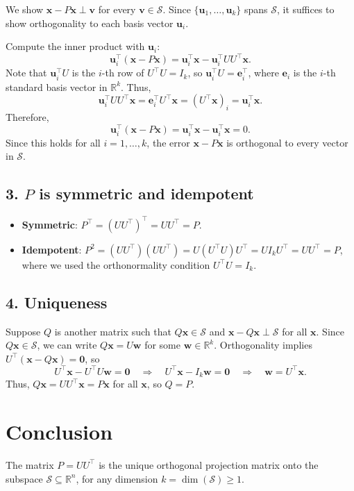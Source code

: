 We show $ \mathbf{x} - P\mathbf{x} \perp \mathbf{v} $ for every $ \mathbf{v} \in \mathcal{S} $.  
Since $ \{\mathbf{u}_1, \dots, \mathbf{u}_k\} $ spans $ \mathcal{S} $, it suffices to show orthogonality to each basis vector $ \mathbf{u}_i $.

Compute the inner product with $ \mathbf{u}_i $:
\[
\mathbf{u}_i^\top (\mathbf{x} - P\mathbf{x}) = \mathbf{u}_i^\top \mathbf{x} - \mathbf{u}_i^\top U U^\top \mathbf{x}.
\]
Note that $ \mathbf{u}_i^\top U $ is the $ i $-th row of $ U^\top U = I_k $, so $ \mathbf{u}_i^\top U = \mathbf{e}_i^\top $, where $ \mathbf{e}_i $ is the $ i $-th standard basis vector in $ \mathbb{R}^k $. Thus,
\[
\mathbf{u}_i^\top U U^\top \mathbf{x} = \mathbf{e}_i^\top U^\top \mathbf{x} = (U^\top \mathbf{x})_i = \mathbf{u}_i^\top \mathbf{x}.
\]
Therefore,
\[
\mathbf{u}_i^\top (\mathbf{x} - P\mathbf{x}) = \mathbf{u}_i^\top \mathbf{x} - \mathbf{u}_i^\top \mathbf{x} = 0.
\]
Since this holds for all $ i = 1, \dots, k $, the error $ \mathbf{x} - P\mathbf{x} $ is orthogonal to every vector in $ \mathcal{S} $.

\subsection*{3. $ P $ is symmetric and idempotent}


\begin{itemize}
\item \textbf{Symmetric}: $ P^\top = (U U^\top)^\top = U U^\top = P $.
    \item \textbf{Idempotent}: $ P^2 = (U U^\top)(U U^\top) = U (U^\top U) U^\top = U I_k U^\top = U U^\top = P $,
    where we used the orthonormality condition $ U^\top U = I_k $.
\end{itemize}


\subsection*{4. Uniqueness}

Suppose $ Q $ is another matrix such that $ Q\mathbf{x} \in \mathcal{S} $ and $ \mathbf{x} - Q\mathbf{x} \perp \mathcal{S} $ for all $ \mathbf{x} $.  
Since $ Q\mathbf{x} \in \mathcal{S} $, we can write $ Q\mathbf{x} = U \mathbf{w} $ for some $ \mathbf{w} \in \mathbb{R}^k $.  
Orthogonality implies $ U^\top (\mathbf{x} - Q\mathbf{x}) = \mathbf{0} $, so
\[
U^\top \mathbf{x} - U^\top U \mathbf{w} = \mathbf{0} \quad \Rightarrow \quad U^\top \mathbf{x} - I_k \mathbf{w} = \mathbf{0} \quad \Rightarrow \quad \mathbf{w} = U^\top \mathbf{x}.
\]
Thus, $ Q\mathbf{x} = U U^\top \mathbf{x} = P\mathbf{x} $ for all $ \mathbf{x} $, so $ Q = P $.

\section*{Conclusion}

The matrix $ P = U U^\top $ is the unique orthogonal projection matrix onto the subspace $ \mathcal{S} \subseteq \mathbb{R}^n $, for any dimension $ k = \dim(\mathcal{S}) \geq 1 $.







